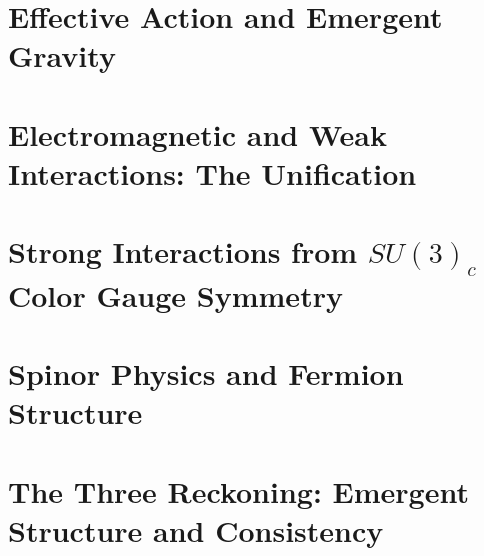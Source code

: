 \documentclass[12pt,a4paper]{article}
\begin{document}



\newpage
\section{Effective Action and Emergent Gravity}
\label{sec:effectiveActionGravity}







\newpage
\section{Electromagnetic and Weak Interactions: The Unification}
\label{sec:electroweakInteractions}




\newpage
\section{Strong Interactions from $SU(3)_c$ Color Gauge Symmetry}
\label{sec:strongInteractions}







\newpage
\section{Spinor Physics and Fermion Structure}
\label{sec:fermionStructure}





\newpage
\section{The Three Reckoning: Emergent Structure and Consistency}
\label{sec:threeReckoning}




\end{document}
